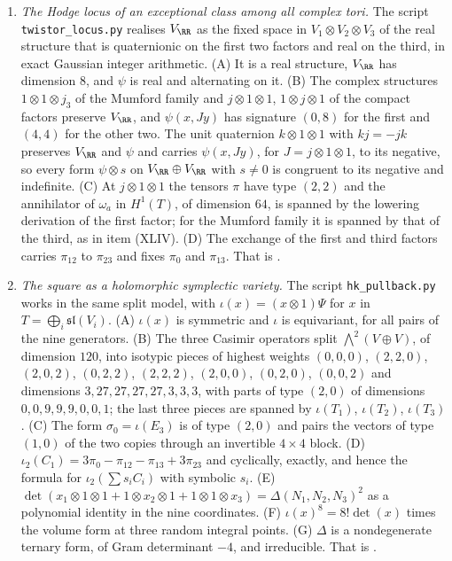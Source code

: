 \begin{enumerate}[label=\textup{(\Roman*)},leftmargin=*]
\item \emph{The Hodge locus of an exceptional class among all complex tori.}
  The script \texttt{twistor\_\allowbreak locus.py} realises $V_{\RR}$ as the
  fixed space in $V_{1}\otimes V_{2}\otimes V_{3}$ of the real structure that
  is quaternionic on the first two factors and real on the third, in exact
  Gaussian integer arithmetic. (A) It is a real structure, $V_{\RR}$ has
  dimension $8$, and $\psi$ is real and alternating on it. (B) The complex
  structures $1\otimes1\otimes j_{3}$ of the Mumford family and
  $j\otimes1\otimes1$, $1\otimes j\otimes1$ of the compact factors preserve
  $V_{\RR}$, and $\psi(x,Jy)$ has signature $(0,8)$ for the first and $(4,4)$
  for the other two. The unit quaternion $k\otimes1\otimes1$ with $kj=-jk$
  preserves $V_{\RR}$ and $\psi$ and carries $\psi(x,Jy)$, for
  $J=j\otimes1\otimes1$, to its negative, so every form $\psi\otimes s$ on
  $V_{\RR}\oplus V_{\RR}$ with $s\ne0$ is congruent to its negative and
  indefinite. (C) At $j\otimes1\otimes1$
  the tensors $\pi$ have type $(2,2)$ and the annihilator of $\omega_{a}$ in
  $H^{1}(T)$, of dimension $64$, is spanned by the lowering derivation of the
  first factor; for the Mumford family it is spanned by that of the third,
  as in item (XLIV). (D) The exchange of the first and third factors carries
  $\pi_{12}$ to $\pi_{23}$ and fixes $\pi_{0}$ and $\pi_{13}$. That is
  .

\item \emph{The square as a holomorphic symplectic variety.} The script
  \texttt{hk\_\allowbreak pullback.py} works in the same split model, with
  $\iota(x)=(x\otimes1)\Psi$ for $x$ in $T=\bigoplus_{i}\mathfrak{sl}(V_{i})$.
  (A) $\iota(x)$ is symmetric and $\iota$ is equivariant, for all pairs of the
  nine generators. (B) The three Casimir operators split
  $\bigwedge^{2}(V\oplus V)$, of dimension $120$, into isotypic pieces of
  highest weights $(0,0,0)$, $(2,2,0)$, $(2,0,2)$, $(0,2,2)$, $(2,2,2)$,
  $(2,0,0)$, $(0,2,0)$, $(0,0,2)$ and dimensions $3,27,27,27,27,3,3,3$, with
  parts of type $(2,0)$ of dimensions $0,0,9,9,9,0,0,1$; the last three pieces
  are spanned by $\iota(T_{1})$, $\iota(T_{2})$, $\iota(T_{3})$. (C) The form
  $\sigma_{0}=\iota(E_{3})$ is of type $(2,0)$ and pairs the vectors of type
  $(1,0)$ of the two copies through an invertible $4\times4$ block. (D)
  $\iota_{2}(C_{1})=3\pi_{0}-\pi_{12}-\pi_{13}+3\pi_{23}$ and cyclically,
  exactly, and hence the formula for $\iota_{2}(\sum s_{i}C_{i})$ with symbolic
  $s_{i}$. (E) $\det(x_{1}\otimes1\otimes1+1\otimes x_{2}\otimes1+
  1\otimes1\otimes x_{3})=\Delta(N_{1},N_{2},N_{3})^{2}$ as a polynomial
  identity in the nine coordinates. (F) $\iota(x)^{8}=8!\det(x)$ times the
  volume form at three random integral points. (G) $\Delta$ is a
  nondegenerate ternary form, of Gram determinant $-4$, and irreducible. That
  is .


\end{enumerate}
